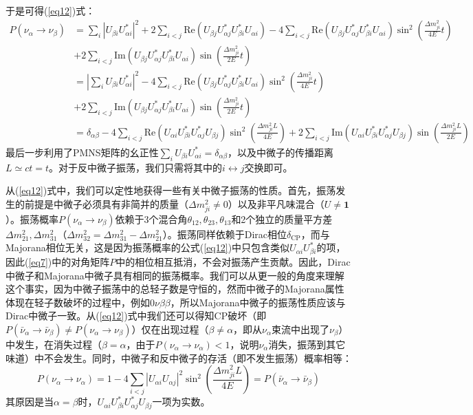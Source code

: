 \documentclass{article}
\begin{document}
	于是可得(\ref{eq12})式：
	\begin{equation*}
		\begin{aligned}
			P(\nu_\alpha\to\nu_\beta)&=\sum_i\left|U_{\beta i}U_{\alpha i}^*\right|^2+2\sum_{i<j}\mathrm{Re}\left(U_{\beta j}U_{\alpha j}^*U_{\beta i}^* U_{\alpha i}\right)-4\sum_{i<j}\mathrm{Re}\left(U_{\beta j}U_{\alpha j}^*U_{\beta i}^* U_{\alpha i}\right)\sin^2\left(\frac{\Delta m_{ji}^2}{4E}t\right)\\
			&+2\sum_{i<j}\mathrm{Im}\left(U_{\beta j}U_{\alpha j}^*U_{\beta i}^* U_{\alpha i}\right)\sin\left(\frac{\Delta m_{ji}^2}{2E}t\right)\\
			&=\left|\sum_iU_{\beta i}U_{\alpha i}^*\right|^2-4\sum_{i<j}\mathrm{Re}\left(U_{\beta j}U_{\alpha j}^*U_{\beta i}^* U_{\alpha i}\right)\sin^2\left(\frac{\Delta m_{ji}^2}{4E}t\right)\\
			&+2\sum_{i<j}\mathrm{Im}\left(U_{\beta j}U_{\alpha j}^*U_{\beta i}^* U_{\alpha i}\right)\sin\left(\frac{\Delta m_{ji}^2}{2E}t\right)\\
			&=\delta_{\alpha\beta}-4\sum_{i<j}\mathrm{Re}(U_{\alpha i}U_{\beta i}^\ast U_{\alpha j}^\ast U_{\beta j})\sin^2\left(\frac{\Delta m_{ji}^2L}{4E}\right)+2\sum_{i<j}\mathrm{Im}(U_{\alpha i}U_{\beta i}^\ast U_{\alpha j}^\ast U_{\beta j})\sin\left(\frac{\Delta m_{ji}^2L}{2E}\right)
		\end{aligned}
	\end{equation*}
	最后一步利用了PMNS矩阵的幺正性$\sum_iU_{\beta i}U_{\alpha i}^*=\delta_{\alpha\beta}$，以及中微子的传播距离$L\simeq ct=t$。对于反中微子振荡，我们只需将其中的$i\leftrightarrow j$交换即可。
	
	从(\ref{eq12})式中，我们可以定性地获得一些有关中微子振荡的性质。首先，振荡发生的前提是中微子必须具有非简并的质量（$\Delta m_{ji}^2\ne0$）以及非平凡味混合（$U\ne\mathbf{1}$）。振荡概率$P(\nu_\alpha\to\nu_\beta)$依赖于3个混合角$\theta_{12},\theta_{23},\theta_{13}$和2个独立的质量平方差$\Delta m_{21}^2,\Delta m_{31}^2$（$\Delta m_{32}^2=\Delta m_{31}^2-\Delta m_{21}^2$）。振荡同样依赖于Dirac相位$\delta_\mathrm{CP}$，而与Majorana相位无关，这是因为振荡概率的公式(\ref{eq12})中只包含类似$U_{\alpha i}U_{\beta i}^*$的项，因此(\ref{eq7})中的对角矩阵$P$中的相位相互抵消，不会对振荡产生贡献。因此，Dirac中微子和Majorana中微子具有相同的振荡概率。我们可以从更一般的角度来理解这个事实，因为中微子振荡中的总轻子数是守恒的，然而中微子的Majorana属性体现在轻子数破坏的过程中，例如$0\nu\beta\beta$，所以Majorana中微子的振荡性质应该与Dirac中微子一致。从(\ref{eq12})式中我们还可以得知CP破坏（即$P(\bar{\nu}_\alpha\to\bar{\nu}_\beta)\ne P(\nu_\alpha\to\nu_\beta)$）仅在出现过程（$\beta\ne\alpha$，即从$\nu_\alpha$束流中出现了$\nu_\beta$）中发生，在消失过程（$\beta=\alpha$，由于$P(\nu_\alpha\to\nu_\alpha)<1$，说明$\nu_\alpha$消失，振荡到其它味道）中不会发生。同时，中微子和反中微子的存活（即不发生振荡）概率相等：
		\begin{equation}
			P(\nu_\alpha\to\nu_\alpha)=1-4\sum_{i<j}|U_{\alpha i}U_{\alpha j}|^2\sin^2\left(\frac{\Delta m_{ji}^2L}{4E}\right)=P(\bar{\nu}_\alpha\to\bar{\nu}_\beta)
		\end{equation}
		其原因是当$\alpha=\beta$时，$U_{\alpha i}U_{\beta i}^*U_{\alpha j}^*U_{\beta j}$一项为实数。
		
\end{document}
